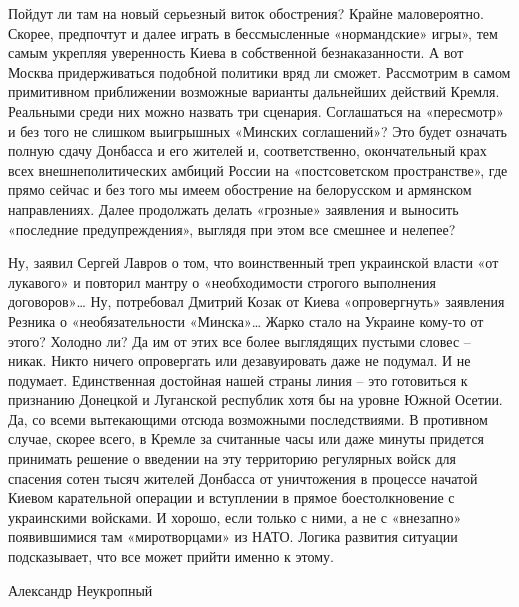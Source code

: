 Пойдут ли там на новый серьезный виток обострения? Крайне маловероятно. Скорее,
предпочтут и далее играть в бессмысленные «нормандские» игры», тем самым
укрепляя уверенность Киева в собственной безнаказанности. А вот Москва
придерживаться подобной политики вряд ли сможет. Рассмотрим в самом примитивном
приближении возможные варианты дальнейших действий Кремля. Реальными среди них
можно назвать три сценария. Соглашаться на «пересмотр» и без того не слишком
выигрышных «Минских соглашений»? Это будет означать полную сдачу Донбасса и его
жителей и, соответственно, окончательный крах всех внешнеполитических амбиций
России на «постсоветском пространстве», где прямо сейчас и без того мы имеем
обострение на белорусском и армянском направлениях. Далее продолжать делать
«грозные» заявления и выносить «последние предупреждения», выглядя при этом все
смешнее и нелепее?

Ну, заявил Сергей Лавров о том, что воинственный треп украинской власти «от
лукавого» и повторил мантру о «необходимости строгого выполнения договоров»…
Ну, потребовал Дмитрий Козак от Киева «опровергнуть» заявления Резника о
«необязательности «Минска»… Жарко стало на Украине кому-то от этого? Холодно
ли? Да им от этих все более выглядящих пустыми словес – никак. Никто ничего
опровергать или дезавуировать даже не подумал. И не подумает. Единственная
достойная нашей страны линия – это готовиться к признанию Донецкой и Луганской
республик хотя бы на уровне Южной Осетии. Да, со всеми вытекающими отсюда
возможными последствиями. В противном случае, скорее всего, в Кремле за
считанные часы или даже минуты придется принимать решение о введении на эту
территорию регулярных войск для спасения сотен тысяч жителей Донбасса от
уничтожения в процессе начатой Киевом карательной операции и вступлении в
прямое боестолкновение с украинскими войсками. И хорошо, если только с ними, а
не с «внезапно» появившимися там «миротворцами» из НАТО. Логика развития
ситуации подсказывает, что все может прийти именно к этому.

Александр Неукропный
  
